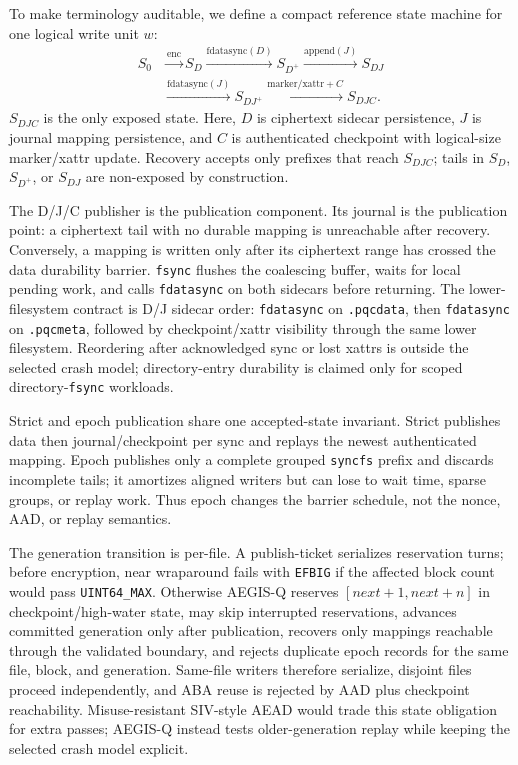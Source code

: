 To make terminology auditable, we define a compact reference state machine for one logical write unit \(w\):
\[
\begin{aligned}
S_0 &\xrightarrow{\mathrm{enc}} S_D
\xrightarrow{\mathrm{fdatasync}(D)} S_{D^+}
\xrightarrow{\mathrm{append}(J)} S_{DJ} \\
&\xrightarrow{\mathrm{fdatasync}(J)} S_{DJ^+}
\xrightarrow{\mathrm{marker/xattr}+C} S_{DJC}.
\end{aligned}
\]
\(S_{DJC}\) is the only exposed state.  Here, \(D\) is ciphertext sidecar persistence, \(J\) is journal mapping persistence, and \(C\) is authenticated checkpoint with logical-size marker/xattr update.  Recovery accepts only prefixes that reach \(S_{DJC}\); tails in \(S_D\), \(S_{D^+}\), or \(S_{DJ}\) are non-exposed by construction.

The D/J/C publisher is the publication component.  Its journal is the publication point: a ciphertext tail with no durable mapping is unreachable after recovery.  Conversely, a mapping is written only after its ciphertext range has crossed the data durability barrier.  \texttt{fsync} flushes the coalescing buffer, waits for local pending work, and calls \texttt{fdatasync} on both sidecars before returning.  The lower-filesystem contract is D/J sidecar order: \texttt{fdatasync} on \texttt{.pqcdata}, then \texttt{fdatasync} on \texttt{.pqcmeta}, followed by checkpoint/xattr visibility through the same lower filesystem.  Reordering after acknowledged sync or lost xattrs is outside the selected crash model; directory-entry durability is claimed only for scoped directory-\texttt{fsync} workloads.

Strict and epoch publication share one accepted-state invariant.  Strict publishes data then journal/checkpoint per sync and replays the newest authenticated mapping.  Epoch publishes only a complete grouped \texttt{syncfs} prefix and discards incomplete tails; it amortizes aligned writers but can lose to wait time, sparse groups, or replay work.  Thus epoch changes the barrier schedule, not the nonce, AAD, or replay semantics.

The generation transition is per-file.  A publish-ticket serializes reservation turns; before encryption, near wraparound fails with \texttt{EFBIG} if the affected block count would pass \texttt{UINT64\_MAX}.  Otherwise AEGIS-Q reserves \([\mathit{next}+1,\mathit{next}+n]\) in checkpoint/high-water state, may skip interrupted reservations, advances committed generation only after publication, recovers only mappings reachable through the validated boundary, and rejects duplicate epoch records for the same file, block, and generation.  Same-file writers therefore serialize, disjoint files proceed independently, and ABA reuse is rejected by AAD plus checkpoint reachability.  Misuse-resistant SIV-style AEAD would trade this state obligation for extra passes; AEGIS-Q instead tests older-generation replay while keeping the selected crash model explicit.

